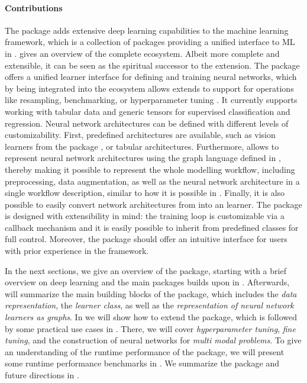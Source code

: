 \documentclass[article, nojss]{jss}
\theoremstyle{definition}
\begin{document}
\paragraph{Contributions} The  package adds extensive deep learning capabilities to the \mlrt{} machine learning framework, which is a collection of \rlang{} packages providing a unified interface to ML in \rlang{}.
 gives an overview of the complete ecosystem.
Albeit more complete and extensible, it can be seen as the spiritual successor to the  \citep{ref-mlr3keras2021} extension.
The package offers a unified learner interface for defining and training neural networks, which by being integrated into the ecosystem allows extends to support for operations like resampling, benchmarking, or hyperparameter tuning \citep{mlr3tuning}.
It currently supports working with tabular data and generic tensors for supervised classification and regression.
Neural network architectures can be defined with different levels of customizability.
First, predefined architectures are available, such as vision learners from the  \rlang{} package \citep{r-torchvision}, or tabular architectures.
Furthermore, \mlrttorch{} allows to represent neural network architectures using the graph language defined in \mlrtpipelines{}, thereby making it possible to represent the whole modelling workflow, including preprocessing, data augmentation, as well as the neural network architecture in a single workflow description, similar to how it is possible in \keras{} \citep{chollet2018keras}.
Finally, it is also possible to easily convert network architectures from \torch{} into an \mlrt{} learner.
The package is designed with extensibility in mind: the training loop is customizable via a callback mechanism and it is easily possible to inherit from predefined classes for full control.
Moreover, the package should offer an intuitive interface for users with prior experience in the \mlrt{} framework.

In the next sections, we give an overview of the package, starting with a brief overview on deep learning and the main \rlang{} packages \mlrttorch{} builds upon in .
Afterwards,  will summarize the main building blocks of the package, which includes the \emph{data representation}, the \emph{learner class}, as well as the \emph{representation of neural network learners as graphs}.
In  we will show how to extend the package, which is followed by some practical use cases in .
There, we will cover \emph{hyperparameter tuning}, \emph{fine tuning}, and the construction of neural networks for \emph{multi modal problems}.
To give an understanding of the runtime performance of the package, we will present some runtime performance benchmarks in .
We summarize the package and future directions in .
\end{document}
